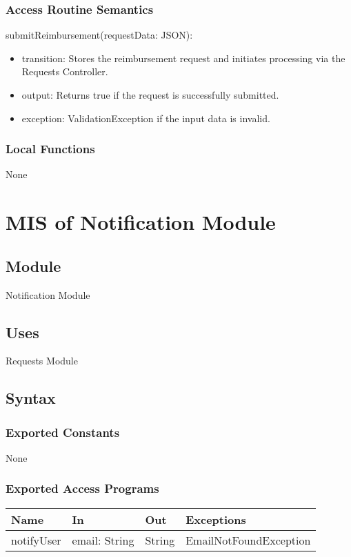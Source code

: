 \documentclass[12pt, titlepage]{article}
\begin{document}
\subsubsection{Access Routine Semantics}
\noindent submitReimbursement(requestData: JSON):
\begin{itemize}
\item transition: Stores the reimbursement request and initiates processing via the Requests Controller.
\item output: Returns true if the request is successfully submitted.
\item exception: ValidationException if the input data is invalid.
\end{itemize}

\subsubsection{Local Functions}
None
\section{MIS of Notification Module} \label{NotificationModule}

\subsection{Module}
Notification Module

\subsection{Uses}
Requests Module

\subsection{Syntax}

\subsubsection{Exported Constants}
None

\subsubsection{Exported Access Programs}

\begin{center}
\begin{tabular}{p{2cm} p{4cm} p{2cm} p{4cm}}
\hline
\textbf{Name} & \textbf{In} & \textbf{Out} & \textbf{Exceptions} \\
\hline
notifyUser & email: String & String & EmailNotFoundException \\
\hline
\end{tabular}
\end{center}
\end{document}
